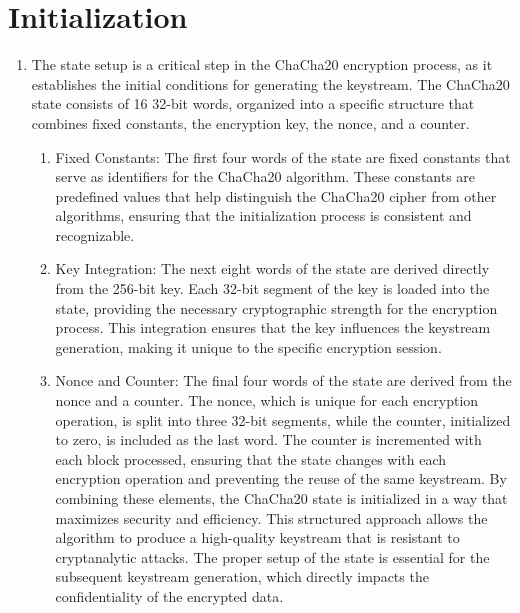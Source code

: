 \documentclass[a4paper,12pt]{report}
\begin{document}
\section{Initialization}
\begin{enumerate}
    \item The state setup is a critical step in the ChaCha20 encryption process, as it establishes the initial conditions for generating the keystream.
    The ChaCha20 state consists of 16 32-bit words, organized into a specific structure that combines fixed constants, the encryption key, the nonce, and a counter.
    \begin{enumerate}
        \item Fixed Constants: The first four words of the state are fixed constants that serve as identifiers for the ChaCha20 algorithm.
    These constants are predefined values that help distinguish the ChaCha20 cipher from other algorithms, ensuring that the initialization process is consistent and recognizable.
\item Key Integration: The next eight words of the state are derived directly from the 256-bit key.
    Each 32-bit segment of the key is loaded into the state, providing the necessary cryptographic strength for the encryption process.
    This integration ensures that the key influences the keystream generation, making it unique to the specific encryption session.
\item Nonce and Counter: The final four words of the state are derived from the nonce and a counter.
    The nonce, which is unique for each encryption operation, is split into three 32-bit segments, while the counter, initialized to zero, is included as the last word.
    The counter is incremented with each block processed, ensuring that the state changes with each encryption operation and preventing the reuse of the same keystream.
    By combining these elements, the ChaCha20 state is initialized in a way that maximizes security and efficiency.
    This structured approach allows the algorithm to produce a high-quality keystream that is resistant to cryptanalytic attacks.
    The proper setup of the state is essential for the subsequent keystream generation, which directly impacts the confidentiality of the encrypted data.
\end{enumerate}
\end{enumerate}
\end{document}
